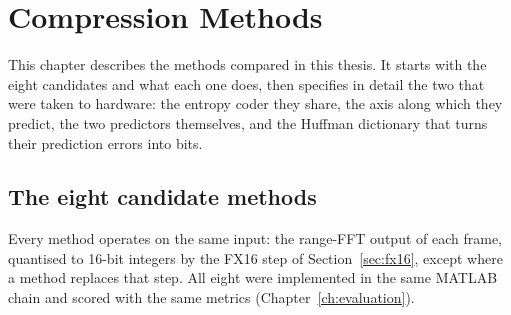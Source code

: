 \chapter{Compression Methods}
\label{ch:methods}

This chapter describes the methods compared in this thesis. It starts with the
eight candidates and what each one does, then specifies in detail the two that
were taken to hardware: the entropy coder they share, the axis along which they
predict, the two predictors themselves, and the Huffman dictionary that turns
their prediction errors into bits.

\section{The eight candidate methods}
\label{sec:candidates}

Every method operates on the same input: the range-FFT output of each frame,
quantised to 16-bit integers by the FX16 step of Section~\ref{sec:fx16}, except
where a method replaces that step. All eight were implemented in the same
MATLAB chain and scored with the same metrics (Chapter~\ref{ch:evaluation}).

